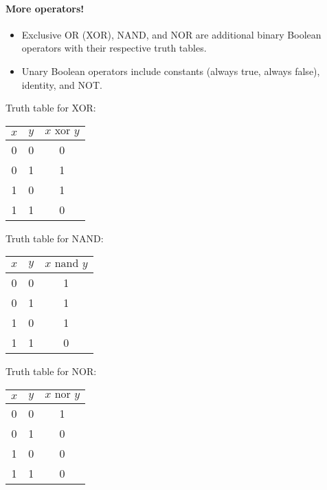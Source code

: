 \documentclass[12pt]{article}
\begin{document}
\paragraph{More operators!}
\begin{itemize}
    \item Exclusive OR (XOR), NAND, and NOR are additional binary Boolean operators with their respective truth tables.
    \item Unary Boolean operators include constants (always true, always false), identity, and NOT.
\end{itemize}

\begin{minipage}{0.3\textwidth}
\centering
Truth table for XOR:

\begin{tabular}{cc|c}
$x$ & $y$ & $x \text{ xor } y$ \\
\hline
0 & 0 & 0 \\
0 & 1 & 1 \\
1 & 0 & 1 \\
1 & 1 & 0 \\
\end{tabular}
\end{minipage}
\hfill
\begin{minipage}{0.3\textwidth}
\centering
Truth table for NAND:

\begin{tabular}{cc|c}
$x$ & $y$ & $x \text{ nand } y$ \\
\hline
0 & 0 & 1 \\
0 & 1 & 1 \\
1 & 0 & 1 \\
1 & 1 & 0 \\
\end{tabular}
\end{minipage}
\hfill
\begin{minipage}{0.3\textwidth}
\centering
Truth table for NOR:

\begin{tabular}{cc|c}
$x$ & $y$ & $x \text{ nor } y$ \\
\hline
0 & 0 & 1 \\
0 & 1 & 0 \\
1 & 0 & 0 \\
1 & 1 & 0 \\
\end{tabular}
\end{minipage}

\vspace{1em}
\end{document}
